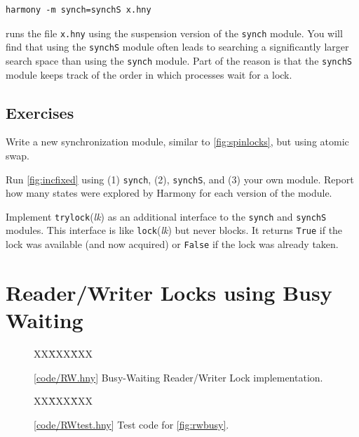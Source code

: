 \documentclass{report}
\newcommand{\harmonysource}[1]{
\begin{tabbing}
XX\=XXX\=XXX\kill
    
\end{tabbing}
}
\newcommand{\harmonylink}[1]{%
[\href{https://www.cs.cornell.edu/home/rvr/harmony/#1}{\underline{#1}}]%
}
\newenvironment{code}{
\tcolorbox
}{
\endtcolorbox
}
\begin{document}
\begin{code}
\begin{verbatim}
harmony -m synch=synchS x.hny
\end{verbatim}
\end{code}

runs the file \texttt{x.hny} using the suspension version of the \texttt{synch} module.
You will find that using the \texttt{synchS} module often leads to searching a
significantly larger search space than using the \texttt{synch} module.
Part of the reason is that the \texttt{synchS} module keeps track of the order
in which processes wait for a lock.

\section*{Exercises}
\begin{problems}
\item Write a new synchronization module, similar to \autoref{fig:spinlocks}, but using
atomic swap.
\item
Run \autoref{fig:incfixed} using (1) \texttt{synch}, (2), \texttt{synchS},
and (3) your own module.  Report how many states were explored by Harmony for each
version of the module.
\item \label{ex:trylock} Implement \texttt{trylock}(\textit{lk}) as an additional
interface to the \texttt{synch} and \texttt{synchS} modules.
This interface is like \texttt{lock}(\textit{lk}) but never blocks.  It
returns \texttt{True} if the lock was available (and now acquired) or \texttt{False}
if the lock was already taken.
\end{problems}

\chapter{Reader/Writer Locks using Busy Waiting}
\label{ch:rdwrbusy}
%

%

\begin{figure}
\begin{code}
\harmonysource{RW}
\end{code}
\caption{\harmonylink{code/RW.hny} Busy-Waiting Reader/Writer Lock implementation.}
\label{fig:rwbusy}
\end{figure}

\begin{figure}
\begin{code}
\harmonysource{RWtest}
\end{code}
\caption{\harmonylink{code/RWtest.hny} Test code for \autoref{fig:rwbusy}.}
\label{fig:rwbusytest}
\end{figure}
\end{document}
